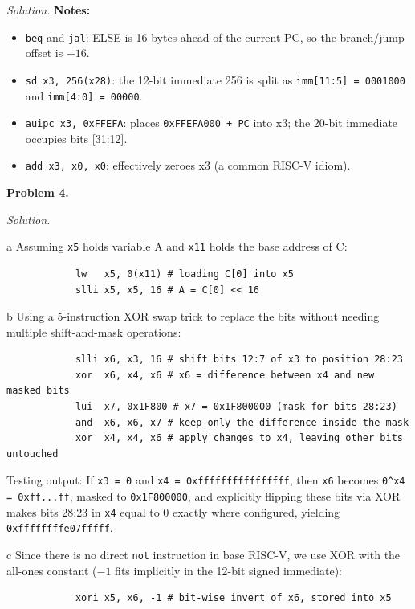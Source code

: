 \documentclass[11pt]{article}
\newcommand{\problem}[1]{\vspace{0.5em}\noindent\textbf{Problem #1.}\vspace{0.3em}}
\newenvironment{solution}{\par\noindent\textit{Solution.}}{\par\vspace{1em}}
\begin{document}
\begin{solution}
\vspace{0.5em}
\noindent\textbf{Notes:}
\begin{itemize}
    \item \texttt{beq} and \texttt{jal}: ELSE is 16 bytes ahead of the current PC, so the branch/jump offset is $+16$.
    \item \texttt{sd x3, 256(x28)}: the 12-bit immediate 256 is split as \texttt{imm[11:5] = 0001000} and \texttt{imm[4:0] = 00000}.
    \item \texttt{auipc x3, 0xFFEFA}: places \texttt{0xFFEFA000 + PC} into x3; the 20-bit immediate occupies bits [31:12].
    \item \texttt{add x3, x0, x0}: effectively zeroes x3 (a common RISC-V idiom).
\end{itemize}

\end{solution}

\problem{4}
\begin{solution}
    \begin{subproblem}{a}
        Assuming \texttt{x5} holds variable A and \texttt{x11} holds the base address of C:
        \begin{verbatim}
            lw   x5, 0(x11) # loading C[0] into x5
            slli x5, x5, 16 # A = C[0] << 16
        \end{verbatim}
    \end{subproblem}

    \begin{subproblem}{b}
        Using a 5-instruction XOR swap trick to replace the bits without needing multiple shift-and-mask operations:
        \begin{verbatim}
            slli x6, x3, 16 # shift bits 12:7 of x3 to position 28:23
            xor  x6, x4, x6 # x6 = difference between x4 and new masked bits
            lui  x7, 0x1F800 # x7 = 0x1F800000 (mask for bits 28:23)
            and  x6, x6, x7 # keep only the difference inside the mask
            xor  x4, x4, x6 # apply changes to x4, leaving other bits untouched
        \end{verbatim}
        Testing output: If \texttt{x3 = 0} and \texttt{x4 = 0xffffffffffffffff}, then \texttt{x6} becomes \texttt{0\textasciicircum x4 = 0xff...ff}, masked to \texttt{0x1F800000}, and explicitly flipping these bits via XOR makes bits 28:23 in \texttt{x4} equal to 0 exactly where configured, yielding \texttt{0xffffffffe07fffff}.
    \end{subproblem}

    \begin{subproblem}{c}
        Since there is no direct \texttt{not} instruction in base RISC-V, we use XOR with the all-ones constant ($-1$ fits implicitly in the 12-bit signed immediate):
        \begin{verbatim}
            xori x5, x6, -1 # bit-wise invert of x6, stored into x5
        \end{verbatim}
    \end{subproblem}
\end{solution}
\end{document}
